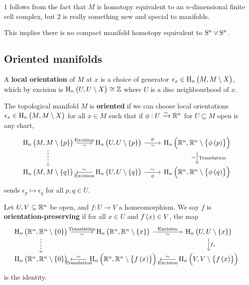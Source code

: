 \begin{remark*}
$ 1 $ follows from the fact that $ M $ is homotopy equivalent to an $ n $-dimensional finite cell complex, but $ 2 $ is really something new and special to manifolds.
\end{remark*}

\begin{example*}
This implies there is no compact manifold homotopy equivalent to $ \S^n \vee \S^n $.
\end{example*}

\subsection{Oriented manifolds}


\begin{definition*}
A \textbf{local orientation} of $ M $ at $ x $ is a choice of generator $ \epsilon_x \in \H_n\br{M, M \setminus X} $, which by excision is $ \H_n\br{U, U \setminus X} \cong \ZZ $ where $ U $ is a disc neighbourhood of $ x $.
\end{definition*}

\begin{definition*}
The topological manifold $ M $ is \textbf{oriented} if we can choose local orientations $ \epsilon_x \in \H_n\br{M, M \setminus X} $ for all $ x \in M $ such that if $ \phi : U \xrightarrow{\sim} \RR^n $ for $ U \subseteq M $ open is any chart,
$$
\begin{tikzcd}
\H_n\br{M, M \setminus \cbr{p}} \arrow{r}{\text{Excision}}[swap]{\sim} \arrow[dashed]{d} & \H_n\br{U, U \setminus \cbr{p}} \arrow{r}{\phi}[swap]{\sim} & \H_n\br{\RR^n, \RR^n \setminus \cbr{\phi\br{p}}} \arrow{d}{\text{Translation}}[swap]{\sim} \\
\H_n\br{M, M \setminus \cbr{q}} & \H_n\br{U, U \setminus \cbr{q}} \arrow{l}{\text{Excision}}[swap]{\sim} \arrow{r}{\sim}[swap]{\phi} & \H_n\br{\RR^n, \RR^n \setminus \cbr{\phi\br{q}}}
\end{tikzcd}
$$
sends $ \epsilon_p \mapsto \epsilon_q $ for all $ p, q \in U $.
\end{definition*}

\begin{definition*}
Let $ U, V \subseteq \RR^n $ be open, and $ f : U \to V $ a homeomorphism. We say $ f $ is \textbf{orientation-preserving} if for all $ x \in U $ and $ f\br{x} \in V $, the map
$$
\begin{tikzcd}
\H_n\br{\RR^n, \RR^n \setminus \cbr{0}} \arrow{r}{\text{Translation}}[swap]{\sim} \arrow[dashed]{d} & \H_n\br{\RR^n, \RR^n \setminus \cbr{x}} \arrow{r}{\text{Excision}}[swap]{\sim} & \H_n\br{U, U \setminus \cbr{x}} \arrow{d}{f_*} \\
\H_n\br{\RR^n, \RR^n \setminus \cbr{0}} & \H_n\br{\RR^n, \RR^n \setminus \cbr{f\br{x}}} \arrow{l}{\text{Translation}}[swap]{\sim} & \H_n\br{V, V \setminus \cbr{f\br{x}}} \arrow{l}{\text{Excision}}[swap]{\sim}
\end{tikzcd}
$$
is the identity.
\end{definition*}

